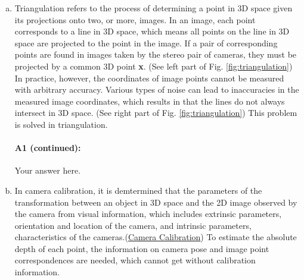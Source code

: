 \begin{enumerate}[(a)]

    \item Triangulation refers to the process of determining a point in 3D space given its projections onto two, or more, images. In an image, each point corresponds to a line in 3D space, which means all points on the line in 3D space are projected to the point in the image. If a pair of corresponding points are found in images taken by the stereo pair of cameras, they must be projected by a common 3D point \textbf{x}. (See left part of Fig. \ref{fig:triangulation}) In practice, however, the coordinates of image points cannot be measured with arbitrary accuracy. Various types of noise can lead to inaccuracies in the measured image coordinates, which results in that the lines do not always intersect in 3D space. (See right part of Fig. \ref{fig:triangulation}) This problem is solved in triangulation.

          \pagebreak
          \paragraph{A1 (continued):} Your answer here.
    \item In camera calibration, it is demtermined that the parameters of the transformation between an object in 3D space and the 2D image observed by the camera from visual information, which includes extrinsic parameters, orientation and location of the camera, and intrinsic parameters, characteristics of the cameras.(\href{https://www.cs.rutgers.edu/~elgammal/classes/cs534/lectures/CameraCalibration-book-chapter.pdf}{Camera Calibration}) To estimate the absolute depth of each point, the information on camera pose and image point correspondences are needed, which cannot get without calibration information.


\end{enumerate}
